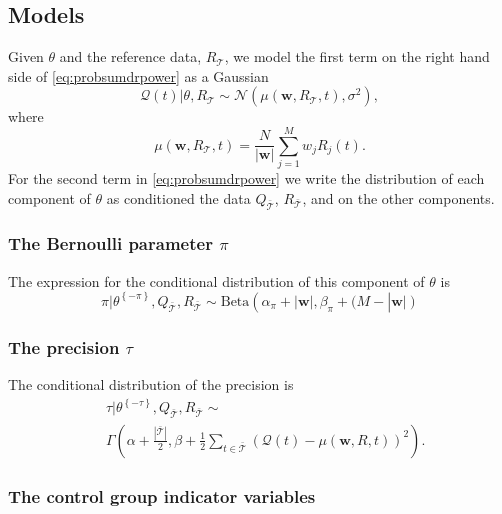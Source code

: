 \documentclass[journal]{IEEEtran}
\newcommand{\normal}[2]{{\mathcal{N}} \left(#1,#2 \right)}
\newcommand{\eventset}{\mathcal{T}}
\newcommand{\wvector}{\mathbf w}
\newcommand{\context}{{\bar {\mathcal{T}}}}
\newcommand{\drpower}{Q}
\newcommand{\sumdrpower}{{\mathcal{Q}}}
\newcommand{\referencepower}{R}
\newcommand{\outdr}{\drpower_\context}
\newcommand{\inreference}{\referencepower_\eventset}
\newcommand{\outreference}{\referencepower_\context}
\newcommand{\thetasans}[1]{\theta^{\left\{-#1\right\}}}
\begin{document}
\subsection{Models}
\label{sec:models}

Given $\theta$ and the reference data, $\inreference$, we model the
first term on the right hand side of \eqref{eq:probsumdrpower} as a
Gaussian
\begin{equation*}
  \sumdrpower(t)|\theta, \inreference \sim \normal{\mu(\wvector,
    \inreference,t)}{\sigma^2},
\end{equation*}
where
\begin{equation*}
  \mu(\wvector, \inreference,t) =
  \frac{N}{\left| \wvector \right|}\sum_{j=1}^M w_j \referencepower_j(t).
\end{equation*}
For the second term in \eqref{eq:probsumdrpower} we write the
distribution of each component of $\theta$ as conditioned the data
$\outdr$, $\outreference$, and on the other components.

\subsubsection{The Bernoulli parameter $\pi$}
\label{sec:bernoulli}

The expression for the conditional distribution of this component of
$\theta$ is
\begin{equation}
  \label{eq:bernoulli}
  \pi | \thetasans{\pi}, \outdr, \outreference \sim
  \text{Beta} \left( \alpha_\pi + \left| \wvector \right|, \beta_\pi +
    (M - \right| \wvector \left| \right)
\end{equation}

\subsubsection{The precision $\tau$}
\label{sec:precision}

The conditional distribution of the precision is
\begin{align}
  &\tau | \thetasans{\tau}, \outdr, \outreference  \sim \nonumber \\
  \label{cond:distributionTau}
  &\Gamma \left(
    \alpha+\frac{\left| \context \right| }{2},
    \beta + \frac{1}{2}\sum_{t\in \context} \left( \sumdrpower(t) -
      \mu(\wvector, \referencepower, t) \right)^2 \right).
\end{align}

\subsubsection{The control group indicator variables}
\label{sec:w_i}
\end{document}
